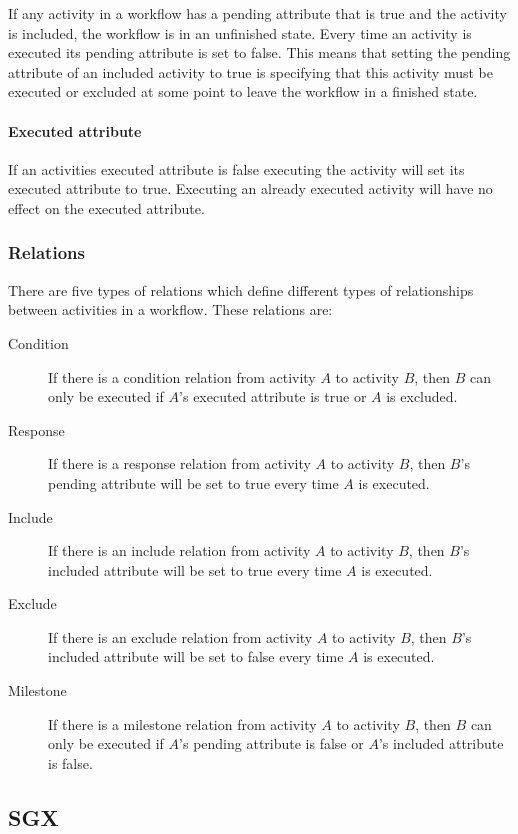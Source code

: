 \documentclass{article}
\begin{document}
			If any activity in a workflow has a pending attribute that is true and the activity is included, the workflow is in an unfinished state.
			Every time an activity is executed its pending attribute is set to false.
			This means that setting the pending attribute of an included activity to true is specifying that this activity must be executed or excluded at some point to leave the workflow in a finished state.

			\paragraph{Executed attribute}

			If an activities executed attribute is false executing the activity will set its executed attribute to true.
			Executing an already executed activity will have no effect on the executed attribute.

		\subsubsection{Relations}

		There are five types of relations which define different types of relationships between activities in a workflow. 
		These relations are:

		\begin{description}
			\item[Condition] If there is a condition relation from activity $A$ to activity $B$, then $B$ can only be executed if $A$'s executed attribute is true or $A$ is excluded.
			\item[Response] If there is a response relation from activity $A$ to activity $B$, then $B$'s pending attribute will be set to true every time $A$ is executed.
			\item[Include] If there is an include relation from activity $A$ to activity $B$, then $B$'s included attribute will be set to true every time $A$ is executed.
			\item[Exclude] If there is an exclude relation from activity $A$ to activity $B$, then $B$'s included attribute will be set to false every time $A$ is executed.
			\item[Milestone] If there is a milestone relation from activity $A$ to activity $B$, then $B$ can only be executed if $A$'s pending attribute is false or $A$'s included attribute is false.
		\end{description}

		\subsection{SGX}
\end{document}
